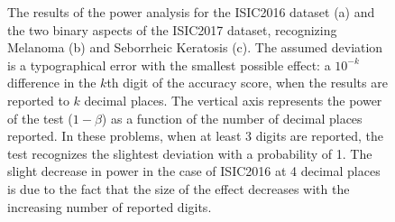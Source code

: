 \documentclass[3p, times]{elsarticle}
\begin{document}
\begin{figure}
    \begin{center}
    \end{center}
    \caption{{The results of the power analysis for the ISIC2016 dataset (a) and the two binary aspects of the ISIC2017 dataset, recognizing Melanoma (b) and Seborrheic Keratosis (c). The assumed deviation is a typographical error with the smallest possible effect: a $10^{-k}$ difference in the $k$th digit of the accuracy score, when the results are reported to $k$ decimal places. The vertical axis represents the power of the test ($1 - \beta$) as a function of the number of decimal places reported. In these problems, when at least 3 digits are reported, the test recognizes the slightest deviation with a probability of 1. The slight decrease in power in the case of ISIC2016 at 4 decimal places is due to the fact that the size of the effect decreases with the increasing number of reported digits.}}
    \label{fig:powerskin}
\end{figure}
\end{document}
